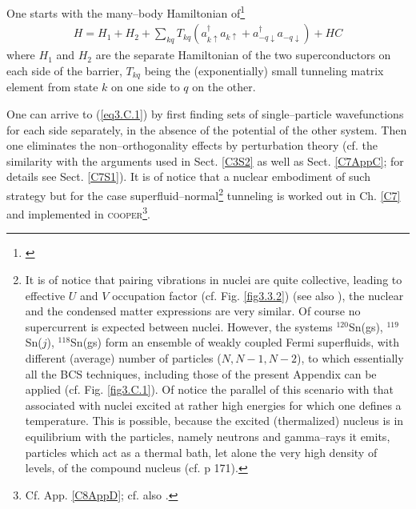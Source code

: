 One starts with the many--body Hamiltonian of\footnote{\cite{Cohen:62}}
\begin{align}\label{eq3.C.1}
H=H_1+H_2+\sum_{kq}T_{kq}(a_{k\uparrow}^\dagger a_{k\uparrow}+a_{-q\downarrow}^\dagger a_{-q\downarrow})+HC
\end{align}
where $H_1$ and $H_2$ are the separate Hamiltonian of the two superconductors on each side of the barrier, $T_{kq}$ being the (exponentially) small tunneling matrix element from state $k$ on one side to $q$ on the other.


One can arrive to  (\ref{eq3.C.1}) by first finding sets of single--particle wavefunctions for each side separately, in the absence of the potential of the other system. Then one eliminates the non--orthogonality effects by perturbation theory (cf. the similarity with the arguments used in Sect. \ref{C3S2} as well as Sect. \ref{C7AppC}; for details see Sect. \ref{C7S1}). It is of notice that a nuclear embodiment of such strategy but for the case superfluid--normal\footnote{It is of notice that pairing vibrations in nuclei are quite collective, leading to effective $U$ and $V$ occupation factor (cf. Fig. \ref{fig3.3.2}) (see also \cite{Potel:13b}), the nuclear and the condensed matter expressions are very similar. Of course no supercurrent is expected between nuclei. However, the systems $^{120}$Sn(gs), $^{119}$Sn($j$), $^{118}$Sn(gs) form an ensemble of weakly coupled Fermi superfluids, with different (average) number of particles ($N,N-1,N-2$), to which essentially all the BCS techniques, including those of the present Appendix can be applied (cf. Fig. \ref{fig3.C.1}). Of notice the parallel of this scenario with that associated with nuclei excited at rather high energies for which one defines a temperature. This is possible, because the excited (thermalized) nucleus is in equilibrium with the particles, namely neutrons and gamma--rays it emits, particles which act as a thermal bath, let alone the very high density of levels, of the compound nucleus (cf. \cite{Bertsch:05} p 171).} tunneling is worked out in Ch. \ref{C7} and implemented in \textsc{cooper}\footnote{Cf. App. \ref{C8AppD}; cf. also \cite{Broglia:05c}.}.


